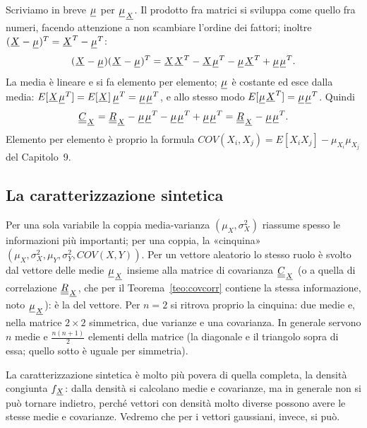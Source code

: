 \begin{dimostrazione}
 Scriviamo in breve $\vett{\mu}$ per $\vett{\mu}_{\vett{X}}$. Il prodotto fra matrici si
sviluppa come quello fra numeri, facendo attenzione a non scambiare l'ordine dei fattori; inoltre
$(\vett{X} - \vett{\mu})^T = \vett{X}^T - \vett{\mu}^T$:
\[ (\vett{X} - \vett{\mu})(\vett{X} - \vett{\mu})^T = \vett{X}\vett{X}^T - \vett{X}\vett{\mu}^T -
   \vett{\mu}\vett{X}^T + \vett{\mu}\vett{\mu}^T . \]
 La media è lineare e si fa elemento per elemento; $\vett{\mu}$ è costante ed esce dalla media:
$E[\vett{X}\vett{\mu}^T] = E[\vett{X}]\, \vett{\mu}^T = \vett{\mu}\vett{\mu}^T$, e allo stesso modo
$E[\vett{\mu}\vett{X}^T] = \vett{\mu}\vett{\mu}^T$. Quindi
\[ \matr{C}_{\vett{X}} = \matr{R}_{\vett{X}} - \vett{\mu}\vett{\mu}^T - \vett{\mu}\vett{\mu}^T + \vett{\mu}\vett{\mu}^T
   = \matr{R}_{\vett{X}} - \vett{\mu}\vett{\mu}^T . \]
Elemento per elemento è proprio la formula $COV(X_i, X_j) = E[X_i X_j] - \mu_{X_i} \mu_{X_j}$ del Capitolo~9.
\end{dimostrazione}

\subsection{La caratterizzazione sintetica}

Per una sola variabile la coppia media-varianza $(\mu_X, \sigma_X^2)$ riassume spesso le informazioni più importanti;
per una coppia, la «cinquina» $(\mu_X, \sigma_X^2, \mu_Y, \sigma_Y^2, COV(X, Y))$. Per un vettore aleatorio lo stesso
ruolo è svolto dal vettore delle medie $\vett{\mu}_{\vett{X}}$ insieme alla matrice di covarianza $\matr{C}_{\vett{X}}$
(o a quella di correlazione $\matr{R}_{\vett{X}}$, che per il Teorema~\ref{teo:covcorr} contiene la stessa
informazione, noto $\vett{\mu}_{\vett{X}}$): è la  del vettore. Per
$n = 2$ si ritrova proprio la cinquina: due medie e, nella matrice $2 \times 2$ simmetrica, due varianze e una
covarianza. In generale servono $n$ medie e $\frac{n(n+1)}{2}$ elementi della matrice (la diagonale e il triangolo sopra
di essa; quello sotto è uguale per simmetria).

La caratterizzazione sintetica è molto più povera di quella completa, la densità congiunta $f_{\vett{X}}$: dalla densità
si calcolano medie e covarianze, ma in generale non si può tornare indietro, perché vettori con densità molto diverse
possono avere le stesse medie e covarianze. Vedremo che per i vettori gaussiani, invece, si può.

